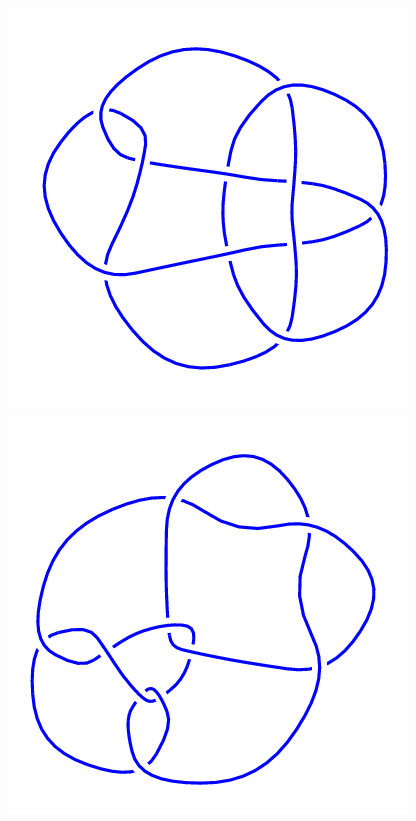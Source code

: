 \begin{figure}[H]
	\begin{minipage}[b]{.18\linewidth}
		\centering
		\includegraphics[width=\linewidth]{../data/10_147.png}
	\end{minipage}
	\begin{minipage}[b]{.18\linewidth}
		\centering
		\includegraphics[width=\linewidth]{../data/10_148.png}

\end{minipage}
\end{figure}
